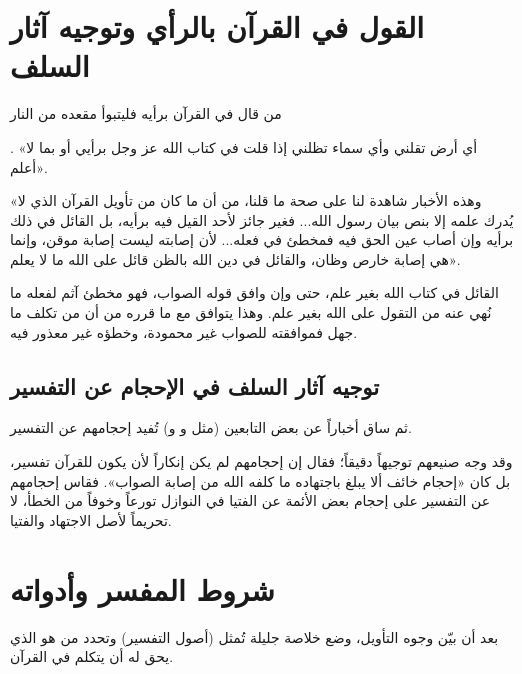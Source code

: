 \separator

\section{القول في القرآن بالرأي وتوجيه آثار السلف}
   \begin{hadith}من قال في القرآن برأيه فليتبوأ مقعده من النار\end{hadith}.    «أي أرض تقلني وأي سماء تظلني إذا قلت في كتاب الله عز وجل برأيي أو بما لا أعلم».

 «وهذه الأخبار شاهدة لنا على صحة ما قلنا، من أن ما كان من تأويل القرآن الذي لا يُدرك علمه إلا بنص بيان رسول الله... فغير جائز لأحد القيل فيه برأيه، بل القائل في ذلك برأيه وإن أصاب عين الحق فيه فمخطئ في فعله... لأن إصابته ليست إصابة موقن، وإنما هي إصابة خارص وظان، والقائل في دين الله بالظن قائل على الله ما لا يعلم».

\begin{fawaid}
القائل في كتاب الله بغير علم، حتى وإن وافق قوله الصواب، فهو مخطئ آثم لفعله ما نُهي عنه من التقول على الله بغير علم. وهذا يتوافق مع ما قرره  من أن من تكلف ما جهل فموافقته للصواب غير محمودة، وخطؤه غير معذور فيه.
\end{fawaid}

\subsection{توجيه آثار السلف في الإحجام عن التفسير}
ثم ساق  أخباراً عن بعض التابعين (مثل  و و) تُفيد إحجامهم عن التفسير.

وقد وجه  صنيعهم توجيهاً دقيقاً؛ فقال إن إحجامهم لم يكن إنكاراً لأن يكون للقرآن تفسير، بل كان «إحجام خائف ألا يبلغ باجتهاده ما كلفه الله من إصابة الصواب». فقاس إحجامهم عن التفسير على إحجام بعض الأئمة عن الفتيا في النوازل تورعاً وخوفاً من الخطأ، لا تحريماً لأصل الاجتهاد والفتيا.

\separator

\section{شروط المفسر وأدواته}
بعد أن بيّن  وجوه التأويل، وضع خلاصة جليلة تُمثل (أصول التفسير) وتحدد من هو الذي يحق له أن يتكلم في القرآن.

